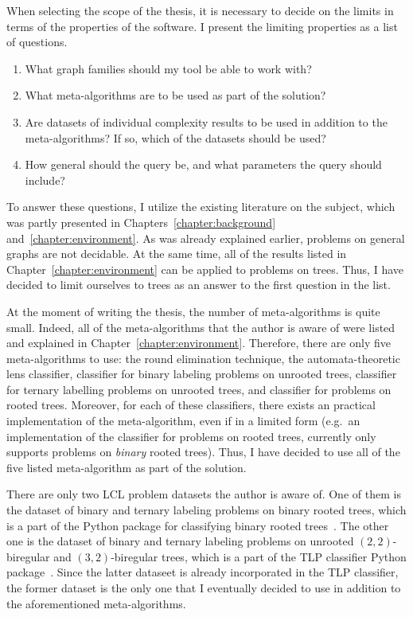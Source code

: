 When selecting the scope of the thesis, it is necessary
to decide on the limits
in terms of the properties of the software. I present the limiting properties
as a list of questions.

\begin{enumerate}
  \item What graph families should my tool be able to work with?
  \item What meta-algorithms are to be used as part of the solution?
  \item Are datasets of individual complexity results to be used
  in addition to the meta-algorithms? If so, which of the datasets should be used?
  \item How general should the query be, and what parameters the query should include?
\end{enumerate}

To answer these questions, I utilize the existing literature on the subject, which was partly presented in Chapters~\ref{chapter:background} and~\ref{chapter:environment}. As was already explained earlier, problems on general graphs are not decidable. At the same time, all of the results listed in Chapter~\ref{chapter:environment} can be applied to problems on trees. Thus,
I have decided to limit ourselves to trees as an answer to the first question in the list.

At the moment of writing the thesis, the number of meta-algorithms is
quite small. Indeed, all of the meta-algorithms that the author is aware of were listed and explained in Chapter~\ref{chapter:environment}. Therefore, there are only five meta-algorithms to use: the round elimination technique, the automata-theoretic lens classifier, classifier for binary labeling problems on unrooted trees, classifier for ternary labelling problems on unrooted trees, and classifier for problems on rooted trees. Moreover, for each of these classifiers, there exists an practical implementation of the meta-algorithm, even if in a limited form (e.g.\ an implementation of the classifier for problems on rooted trees, currently only supports problems on \emph{binary} rooted trees). Thus, I have decided to use all of the five listed meta-algorithm as part of the solution.

There are only two LCL problem datasets the author is aware of. One of them is the dataset of binary and ternary labeling problems on binary rooted trees, which is a
part of the Python package for classifying binary rooted trees~\cite{Tereshchenko2020brt}. The other one is the dataset of binary and ternary labeling problems on
unrooted $(2, 2)$-biregular and $(3, 2)$-biregular trees, which is a part of the TLP classifier Python package~\cite{Rocher2020clas}. Since the latter dataseet is already incorporated in the TLP classifier,
the former dataset is the only one that I eventually decided to use
in addition to the aforementioned meta-algorithms.

